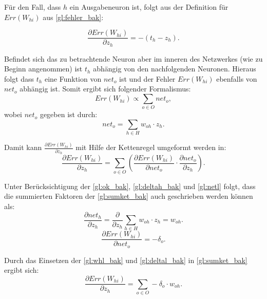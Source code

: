 Für den Fall, dass $h$ ein Ausgabeneuron ist, folgt aus der Definition für $Err(W_{hi})$ aus \autoref{gl:fehler_bak}:

\begin{equation}
\frac{\partial Err(W_{hi})}{\partial z_{h}} = -(t_h - z_h).
\end{equation}

Befindet sich das zu betrachtende Neuron aber im inneren des Netzwerkes (wie zu Beginn angenommen) ist $t_h$ abhängig von den nachfolgenden Neuronen. Hieraus folgt dass $t_h$ eine Funktion von $net_o$ ist und der Fehler $Err(W_{hi})$ ebenfalls von $net_o$ abhängig ist. Somit ergibt sich folgender Formalismus:
\begin{equation*}
Err(W_{hi}) \propto \sum\limits_{o \in O} net_o,
\end{equation*}
wobei $net_o$ gegeben ist durch:
\begin{equation}
net_{o} = \sum_{h \in H} w_{oh} \cdot z_{h} .
\label{gl:netl}
\end{equation}

Damit kann $\frac{\partial Err(W_{hi})}{\partial z_{h}}$ mit Hilfe der Kettenregel umgeformt werden in:
\begin{equation}
\frac{\partial Err(W_{hi})}{\partial z_{h}} =\sum\limits_{o \in O} \left (  \frac{\partial Err(W_{hi})}{\partial net_{o}} \cdot \frac{\partial net_{o}}{\partial z_{h}} \right ).
\label{gl:sumket_bak}
\end{equation}

Unter Berücksichtigung der \autoref{gl:ok_bak}, \autoref{gl:deltah_bak} und \autoref{gl:netl} folgt, dass die summierten Faktoren der \autoref{gl:sumket_bak} auch geschrieben werden können als:
\begin{equation}
\frac{\partial net_{h}}{\partial z_{h}} = \frac{\partial }{\partial z_{h}} \sum\limits_{h \in H} w_{oh} \cdot z_{h} = w_{oh} .
\label{gl:whl_bak}
\end{equation}
\begin{equation}
\frac{\partial Err(W_{hi})}{\partial net_{o}} = -\delta_o .
\label{gl:deltal_bak}
\end{equation}

Durch das Einsetzen der \autoref{gl:whl_bak} und \autoref{gl:deltal_bak} in \autoref{gl:sumket_bak} ergibt sich:
\begin{equation}
\frac{\partial Err(W_{hi})}{\partial z_{h}} =\sum\limits_{o \in O}  -\delta_o \cdot w_{oh} .
\label{gl:sumketlos_bak}
\end{equation}

